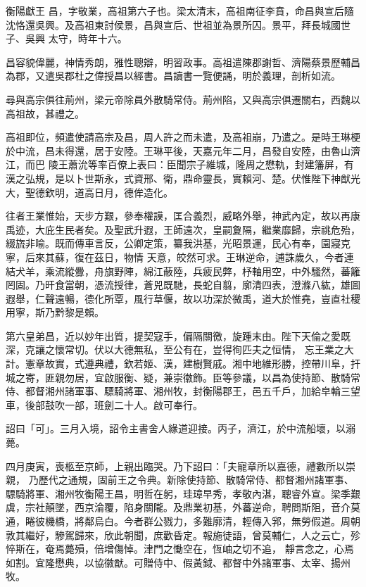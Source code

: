 
\begin{pinyinscope}

 衡陽獻王
 昌，字敬業，高祖第六子也。梁太清末，高祖南征李賁，命昌與宣后隨沈恪還吳興。及高祖東討侯景，昌與宣后、世祖並為景所囚。景平，拜長城國世子、吳興
 太守，時年十六。



 昌容貌偉麗，神情秀朗，雅性聰辯，明習政事。高祖遣陳郡謝哲、濟陽蔡景歷輔昌為郡，又遣吳郡杜之偉授昌以經書。昌讀書一覽便誦，明於義理，剖析如流。



 尋與高宗俱往荊州，梁元帝除員外散騎常侍。荊州陷，又與高宗俱遷關右，西魏以高祖故，甚禮之。



 高祖即位，頻遣使請高宗及昌，周人許之而未遣，及高祖崩，乃遣之。是時王琳梗於中流，昌未得還，居于安陸。王琳平後，天嘉元年二月，昌發自安陸，由魯山濟江，而巴
 陵王蕭沇等率百僚上表曰：臣聞宗子維城，隆周之懋軌，封建籓屏，有漢之弘規，是以卜世斯永，式資邢、衛，鼎命靈長，實賴河、楚。伏惟陛下神猷光大，聖德欽明，道高日月，德侔造化。



 往者王業惟始，天步方艱，參奉權謨，匡合義烈，威略外舉，神武內定，故以再康禹迹，大庇生民者矣。及聖武升遐，王師遠次，皇嗣夐隔，繼業靡歸，宗祧危殆，綴旒非喻。既而傳車言反，公卿定策，纂我洪基，光昭景運，民心有奉，園寢克寧，后來其蘇，復在茲日，物情
 天意，皎然可求。王琳逆命，逋誅歲久，今者連結犬羊，乘流縱釁，舟旗野陣，綿江蔽陸，兵疲民弊，杼軸用空，中外騷然，蕃籬罔固。乃旰食當朝，憑流授律，蒼兕既馳，長蛇自翦，廓清四表，澄滌八紘，雄圖遐舉，仁聲遠暢，德化所覃，風行草偃，故以功深於微禹，道大於惟堯，豈直社稷用寧，斯乃黔黎是賴。



 第六皇弟昌，近以妙年出質，提契寇手，偏隔關徼，旋踵末由。陛下天倫之愛既深，克讓之懷常切。伏以大德無私，至公有在，豈得徇匹夫之恒情，
 忘王業之大計。憲章故實，式遵典禮，欽若姬、漢，建樹賢戚。湘中地維形勝，控帶川阜，扞城之寄，匪親勿居，宜啟服衡、疑，兼崇徽飾。臣等參議，以昌為使持節、散騎常侍、都督湘州諸軍事、驃騎將軍、湘州牧，封衡陽郡王，邑五千戶，加給皁輪三望車，後部鼓吹一部，班劍二十人。啟可奉行。



 詔曰「可」。三月入境，詔令主書舍人緣道迎接。丙子，濟江，於中流船壞，以溺薨。



 四月庚寅，喪柩至京師，上親出臨哭。乃下詔曰：「夫寵章所以嘉德，禮數所以崇親，
 乃歷代之通規，固前王之令典。新除使持節、散騎常侍、都督湘州諸軍事、驃騎將軍、湘州牧衡陽王昌，明哲在躬，珪璋早秀，孝敬內湛，聰睿外宣。梁季艱虞，宗社顛墜，西京淪覆，陷身關隴。及鼎業初基，外蕃逆命，聘問斯阻，音介莫通，睠彼機橋，將鄰烏白。今者群公戮力，多難廓清，輕傳入郛，無勞假道。周朝敦其繼好，驂駕歸來，欣此朝聞，庶歡昏定。報施徒語，曾莫輔仁，人之云亡，殄悴斯在，奄焉薨殞，倍增傷悼。津門之慟空在，恆岫之切不追，
 靜言念之，心焉如割。宜隆懋典，以協徽猷。可贈侍中、假黃鉞、都督中外諸軍事、太宰、揚州牧。




\end{pinyinscope}
